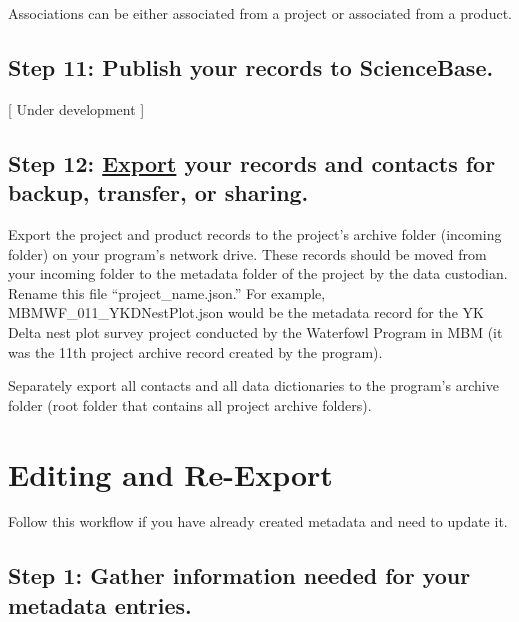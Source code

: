 \documentclass[
]{book}
\begin{document}
Associations can be either associated from a project or associated from a product.

\hypertarget{step-11-publish-your-records-to-sciencebase.}{%
\subsection{Step 11: Publish your records to ScienceBase.}\label{step-11-publish-your-records-to-sciencebase.}}

{[} Under development {]}

\hypertarget{step-12-export-your-records-and-contacts-for-backup-transfer-or-sharing.}{%
\subsection{\texorpdfstring{Step 12: \protect\hyperlink{export}{Export} your records and contacts for backup, transfer, or sharing.}{Step 12: Export your records and contacts for backup, transfer, or sharing.}}\label{step-12-export-your-records-and-contacts-for-backup-transfer-or-sharing.}}

Export the project and product records to the project's archive folder (incoming folder) on your program's network drive. These records should be moved from your incoming folder to the metadata folder of the project by the data custodian. Rename this file ``project\_name.json.'' For example, MBMWF\_011\_YKDNestPlot.json would be the metadata record for the YK Delta nest plot survey project conducted by the Waterfowl Program in MBM (it was the 11th project archive record created by the program).

Separately export all contacts and all data dictionaries to the program's archive folder (root folder that contains all project archive folders).

\hypertarget{editing-and-re-export}{%
\section{Editing and Re-Export}\label{editing-and-re-export}}

Follow this workflow if you have already created metadata and need to update it.

\hypertarget{step-1-gather-information-needed-for-your-metadata-entries.-1}{%
\subsection{Step 1: Gather information needed for your metadata entries.}\label{step-1-gather-information-needed-for-your-metadata-entries.-1}}
\end{document}
